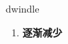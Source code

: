 
\begin{frame}
{\huge dwindle}
\begin{center}
\begin{enumerate}\Large
  \item \textbf{逐渐减少}
\end{enumerate}
\end{center}
\end{frame}
